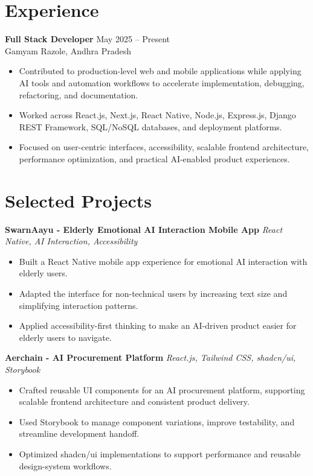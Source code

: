 \documentclass[10pt,a4paper]{article}
\newcommand{\resumeItem}[1]{\item #1}
\newcommand{\role}[4]{\textbf{#1} \hfill #2\\#3 \hfill #4\vspace{-2pt}}
\begin{document}
\section{Experience}
\role{Full Stack Developer}{May 2025 -- Present}{Gamyam}{Razole, Andhra Pradesh}
\begin{itemize}
\resumeItem{Contributed to production-level web and mobile applications while applying AI tools and automation workflows to accelerate implementation, debugging, refactoring, and documentation.}
\resumeItem{Worked across React.js, Next.js, React Native, Node.js, Express.js, Django REST Framework, SQL/NoSQL databases, and deployment platforms.}
\resumeItem{Focused on user-centric interfaces, accessibility, scalable frontend architecture, performance optimization, and practical AI-enabled product experiences.}
\end{itemize}

\section{Selected Projects}
\textbf{SwarnAayu - Elderly Emotional AI Interaction Mobile App} \hfill \textit{React Native, AI Interaction, Accessibility}
\begin{itemize}
\resumeItem{Built a React Native mobile app experience for emotional AI interaction with elderly users.}
\resumeItem{Adapted the interface for non-technical users by increasing text size and simplifying interaction patterns.}
\resumeItem{Applied accessibility-first thinking to make an AI-driven product easier for elderly users to navigate.}
\end{itemize}

\textbf{Aerchain - AI Procurement Platform} \hfill \textit{React.js, Tailwind CSS, shadcn/ui, Storybook}
\begin{itemize}
\resumeItem{Crafted reusable UI components for an AI procurement platform, supporting scalable frontend architecture and consistent product delivery.}
\resumeItem{Used Storybook to manage component variations, improve testability, and streamline development handoff.}
\resumeItem{Optimized shadcn/ui implementations to support performance and reusable design-system workflows.}
\end{itemize}
\end{document}
